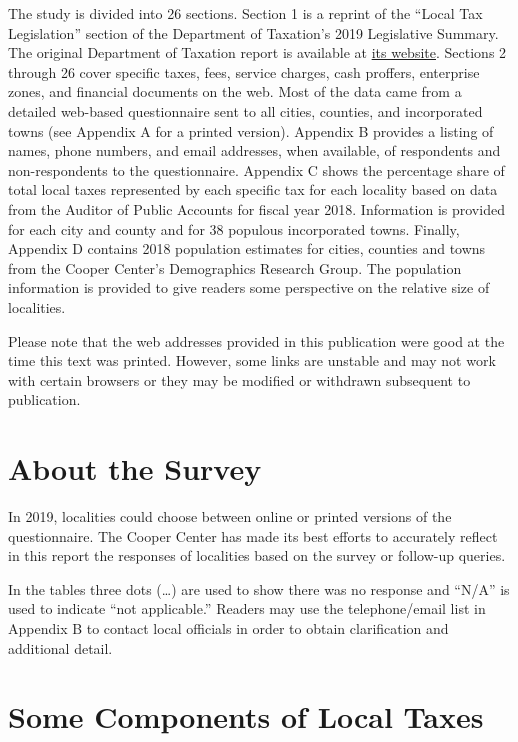 \documentclass[
]{book}
\begin{document}
The study is divided into 26 sections. Section 1 is a reprint of the ``Local Tax Legislation'' section of the Department of Taxation's 2019 Legislative Summary. The original Department of Taxation report is available at \href{https://tax.virginia.gov/legislative-summary-reports}{its website}. Sections 2 through 26 cover specific taxes, fees, service charges, cash proffers, enterprise zones, and financial documents on the web. Most of the data came from a detailed web-based questionnaire sent to all cities, counties, and incorporated towns (see Appendix A for a printed version). Appendix B provides a listing of names, phone numbers, and email addresses, when available, of respondents and non-respondents to the questionnaire. Appendix C shows the percentage share of total local taxes represented by each specific tax for each locality based on data from the Auditor of Public Accounts for fiscal year 2018. Information is provided for each city and county and for 38 populous incorporated towns. Finally, Appendix D contains 2018 population estimates for cities, counties and towns from the Cooper Center's Demographics Research Group. The population information is provided to give readers some perspective on the relative size of localities.

Please note that the web addresses provided in this publication were good at the time this text was printed. However, some links are unstable and may not work with certain browsers or they may be modified or withdrawn subsequent to publication.

\hypertarget{about-the-survey}{%
\section*{About the Survey}\label{about-the-survey}}

In 2019, localities could choose between online or printed versions of the questionnaire. The Cooper Center has made its best efforts to accurately reflect in this report the responses of localities based on the survey or follow-up queries.

In the tables three dots (\ldots) are used to show there was no response and ``N/A'' is used to indicate ``not applicable.'' Readers may use the telephone/email list in Appendix B to contact local officials in order to obtain clarification and additional detail.

\hypertarget{some-components-of-local-taxes}{%
\section*{Some Components of Local Taxes}\label{some-components-of-local-taxes}}
\end{document}

